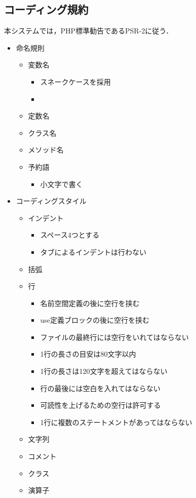 \documentclass[a4paper, titlepage]{jsarticle}
\begin{document}
\subsection{コーディング規約}
本システムでは，PHP標準勧告であるPSR-2に従う．
\begin{itemize}
  \item 命名規則
  \begin{itemize}
    \item 変数名
    \begin{itemize}
      \item スネークケースを採用
      \item 
    \end{itemize}
    \item 定数名
    \item クラス名
    \item メソッド名
    \item 予約語
    \begin{itemize}
      \item 小文字で書く
    \end{itemize}
  \end{itemize}
  \item コーディングスタイル
  \begin{itemize}
    \item インデント
    \begin{itemize}
      \item スペース4つとする
      \item タブによるインデントは行わない
    \end{itemize}
    \item 括弧
    \item 行
    \begin{itemize}
      \item 名前空間定義の後に空行を挟む
      \item use定義ブロックの後に空行を挟む
      \item ファイルの最終行には空行をいれてはならない
      \item 1行の長さの目安は80文字以内
      \item 1行の長さは120文字を超えてはならない
      \item 行の最後には空白を入れてはならない
      \item 可読性を上げるための空行は許可する
      \item 1行に複数のステートメントがあってはならない
    \end{itemize}
    \item 文字列
    \item コメント
    \item クラス
    \item 演算子
  \end{itemize}
\end{itemize}
\end{document}
